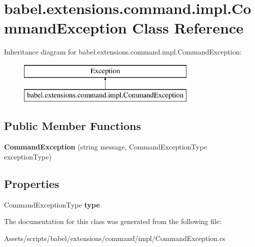 \hypertarget{classbabel_1_1extensions_1_1command_1_1impl_1_1_command_exception}{\section{babel.\-extensions.\-command.\-impl.\-Command\-Exception Class Reference}
\label{classbabel_1_1extensions_1_1command_1_1impl_1_1_command_exception}
}
Inheritance diagram for babel.\-extensions.\-command.\-impl.\-Command\-Exception\-:\begin{figure}[H]
\begin{center}
\leavevmode
\includegraphics[height=2.000000cm]{classbabel_1_1extensions_1_1command_1_1impl_1_1_command_exception}
\end{center}
\end{figure}
\subsection*{Public Member Functions}
\begin{DoxyCompactItemize}
\item 
\hypertarget{classbabel_1_1extensions_1_1command_1_1impl_1_1_command_exception_ac40ea9765a0c63a59a46a114320602ff}{{\bfseries Command\-Exception} (string message, Command\-Exception\-Type exception\-Type)}\label{classbabel_1_1extensions_1_1command_1_1impl_1_1_command_exception_ac40ea9765a0c63a59a46a114320602ff}

\end{DoxyCompactItemize}
\subsection*{Properties}
\begin{DoxyCompactItemize}
\item 
\hypertarget{classbabel_1_1extensions_1_1command_1_1impl_1_1_command_exception_a8c1e7b89bb7c2d1295c0ab8c980bf139}{Command\-Exception\-Type {\bfseries type}}\label{classbabel_1_1extensions_1_1command_1_1impl_1_1_command_exception_a8c1e7b89bb7c2d1295c0ab8c980bf139}

\end{DoxyCompactItemize}


The documentation for this class was generated from the following file\-:\begin{DoxyCompactItemize}
\item 
Assets/scripts/babel/extensions/command/impl/Command\-Exception.\-cs\end{DoxyCompactItemize}
